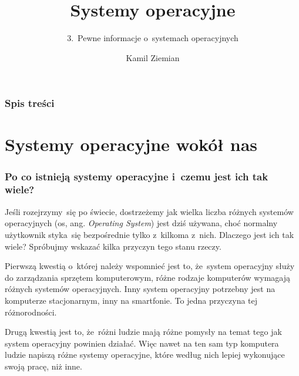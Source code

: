 \documentclass[10pt,t]{beamer}
\title{Systemy operacyjne}
\subtitle{3.~Pewne informacje o~systemach operacyjnych}
\author{Kamil Ziemian \\
  \email}
\begin{document}





\RaggedRight





\maketitle





\begin{frame}
  \frametitle{Spis treści}


  \tableofcontents

\end{frame}










\section{Systemy operacyjne wokół nas}


\begin{frame}
  \frametitle{Po co istnieją systemy operacyjne i~czemu jest ich
    tak wiele?}


  Jeśli rozejrzymy~się po świecie, dostrzeżemy jak wielka liczba różnych
  systemów operacyjnych (os, ang. \textit{Operating System}) jest dziś
  używana, choć normalny użytkownik
  styka~się bezpośrednie tylko z~kilkoma z~nich. Dlaczego jest ich tak
  wiele? Spróbujmy wskazać kilka przyczyn tego stanu rzeczy.

  Pierwszą kwestią o~której należy wspomnieć jest to, że~system operacyjny
  służy do zarządzania sprzętem komputerowym, różne rodzaje komputerów
  wymagają różnych systemów operacyjnych. Inny system operacyjny potrzebny
  jest na komputerze stacjonarnym, inny na smartfonie. To jedna przyczyna
  tej różnorodności.

  Drugą kwestią jest to, że~różni ludzie mają różne pomysły na temat tego
  jak system operacyjny powinien działać. Więc nawet na ten sam typ
  komputera ludzie napiszą różne systemy operacyjne, które według nich
  lepiej wykonujące swoją pracę, niż inne.

\end{frame}
\end{document}
